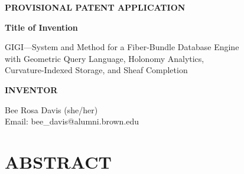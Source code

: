 \documentclass[11pt,letterpaper]{article}
\begin{document}
\begin{center}
{\Large\textbf{PROVISIONAL PATENT APPLICATION}}

\vspace{0.5cm}

{\LARGE\textbf{Title of Invention}}

\vspace{0.3cm}

{\Large GIGI---System and Method for a Fiber-Bundle Database Engine\\
with Geometric Query Language, Holonomy Analytics,\\
Curvature-Indexed Storage, and Sheaf Completion}

\vspace{1cm}

{\large\textbf{INVENTOR}}

\vspace{0.3cm}

Bee Rosa Davis (she/her)\\
Email: bee\_davis@alumni.brown.edu

\vspace{1cm}
\end{center}


\newpage
\section*{ABSTRACT}
\end{document}
